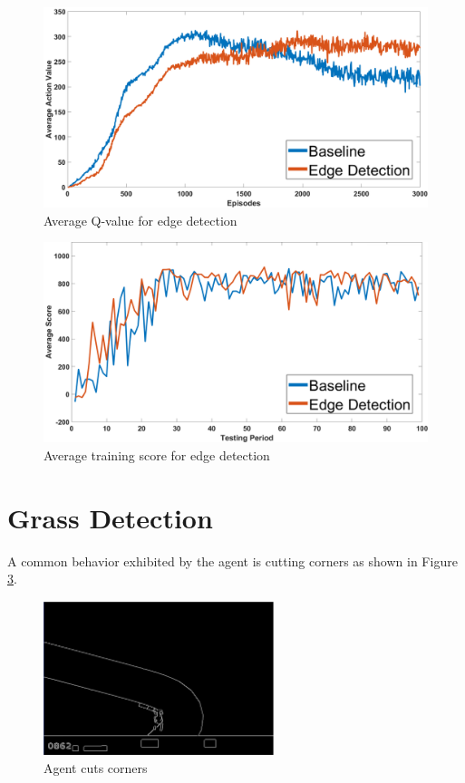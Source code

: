 \begin{figure}[]
\centering
\includegraphics[width=.6\linewidth]{Graphics/edge_perf_q_large.png}
\caption{Average Q-value for edge detection}
\label{fig:aveQ_edge}
\end{figure}

\begin{figure}[]
\centering
\includegraphics[width=.6\linewidth]{Graphics/edge_perf_score_large.png}
\caption{Average training score for edge detection}
\label{fig:test_edge}
\end{figure}

\newpage
\section{Grass Detection}
A common behavior exhibited by the agent is cutting corners as shown
in Figure \ref{fig:cut_corner}. 

\begin{figure}[h]
\centering
\includegraphics[width=0.6\textwidth]{Graphics/cut_corner.png}
\caption{Agent cuts corners}
\label{fig:cut_corner}
\end{figure}


